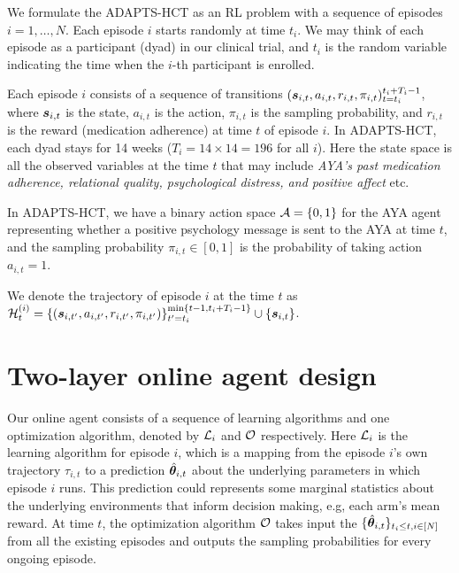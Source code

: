 \documentclass{article}
\newcommand{\sam}[1]{
  {\color{blue} [SAM: {#1}]}
 }
\begin{document}
We formulate the ADAPTS-HCT as an RL problem with a sequence of episodes $i = 1, \dots, N$. Each episode $i$ starts randomly at time $t_i$. We may think of each episode as a participant (dyad) in our clinical trial, and $t_i$ is the random variable indicating the time when the $i$-th participant is enrolled.

Each episode $i$ consists of a sequence of transitions $({\bm{s}}_{i, t}, a_{i, t}, r_{i, t}, \pi_{i, t})_{t=t_i}^{t_i+T_i-1}$, where ${\bm{s}}_{i, t}$ is the state, $a_{i, t}$ is the action, $\pi_{i, t}$ is the sampling probability, and $r_{i, t}$ is the reward (medication adherence) at time $t$ of episode $i$. In ADAPTS-HCT, each dyad stays for 14 weeks ($T_i = 14 \times 14 = 196$ for all $i$). Here the state space is all the observed variables at the time $t$ that may include \textit{AYA's past medication adherence, relational quality, psychological distress, and positive affect} etc.

In ADAPTS-HCT, we have a binary action space ${\mathcal{A}} = \{0, 1\}$ for the AYA agent representing whether a positive psychology message is sent to the AYA at time $t$, and the sampling probability $\pi_{i, t} \in [0, 1]$ is the probability of taking action $a_{i, t} = 1$.

We denote the trajectory of episode $i$ at the time $t$ as ${\mathcal{H}}_{t}^{(i)} = \{({\bm{s}}_{i, t'}, a_{i, t'}, r_{i, t'}, \pi_{i, t'}) \}_{t'=t_i}^{\min\{t-1, t_i + T_i-1\}} \cup \{{\bm{s}}_{i, t}\}$.

\section{Two-layer online agent design}

Our online agent consists of a sequence of learning algorithms and one optimization algorithm, denoted by ${\mathcal{L}}_i$ and ${\mathcal{O}}$ respectively. Here ${\mathcal{L}}_i$ is the learning algorithm for episode $i$, which is a mapping from the episode $i$'s own trajectory $\tau_{i, t}$ to a prediction $\hat {{\bm{\theta}}}_{i, t}$ about the underlying parameters in which episode $i$ runs. This prediction could represents some marginal statistics about the underlying environments that inform decision making, e.g, each arm's mean reward. 
At time $t$, the optimization algorithm ${\mathcal{O}}$ takes input the $\{\hat {{\bm{\theta}}}_{i,t}\}_{t_i\le t,i\in[N]}$ from all the existing episodes and outputs the sampling probabilities for every ongoing episode.
\end{document}
